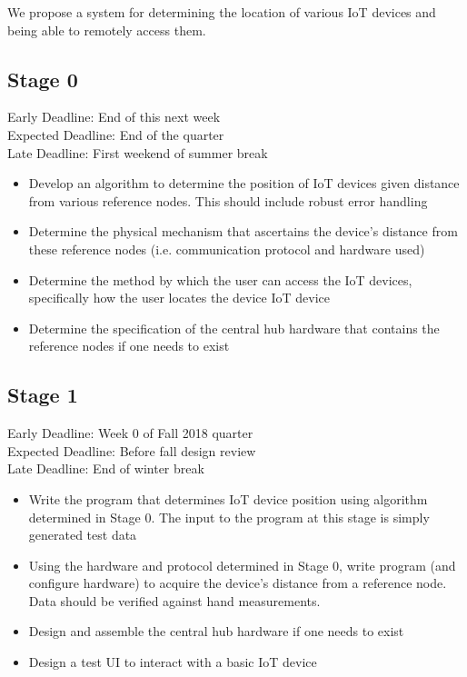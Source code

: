 \documentclass{article}
\begin{document}
We propose a system for determining the location of various IoT devices and being able to remotely access them.

\subsection{Stage 0}
Early Deadline: End of this next week \\
Expected Deadline: End of the quarter \\
Late Deadline: First weekend of summer break \\
\begin{itemize}
\item Develop an algorithm to determine the position of IoT devices given distance from various reference nodes. This should include robust error handling
\item Determine the physical mechanism that ascertains the device's distance from these reference nodes (i.e. communication protocol and hardware used)
\item Determine the method by which the user can access the IoT devices, specifically how the user locates the device IoT device
\item Determine the specification of the central hub hardware that contains the reference nodes if one needs to exist
\end{itemize}

\subsection{Stage 1}
Early Deadline: Week 0 of Fall 2018 quarter \\
Expected Deadline: Before fall design review \\
Late Deadline: End of winter break \\
\begin{itemize}
\item Write the program that determines IoT device position using algorithm determined in Stage 0. The input to the program at this stage is simply generated test data
\item Using the hardware and protocol determined in Stage 0, write program (and configure hardware) to acquire the device's distance from a reference node. Data should be verified against hand measurements.
\item Design and assemble the central hub hardware if one needs to exist
\item Design a test UI to interact with a basic IoT device
\end{itemize}
\end{document}
